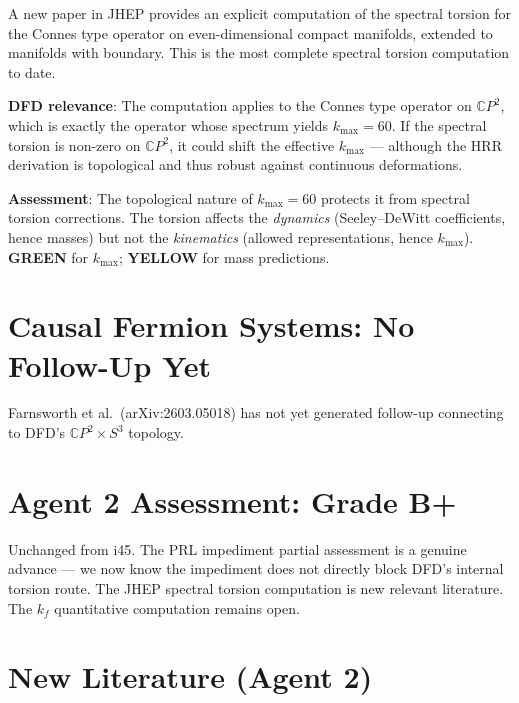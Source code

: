 \documentclass[11pt,a4paper]{article}
\newcommand{\GREEN}{\textcolor{dfdgreen}{\textbf{GREEN}}}
\newcommand{\YELLOW}{\textcolor{dfdyellow}{\textbf{YELLOW}}}
\newcommand{\CP}{\mathbb{C}P}
\begin{document}
\begin{tcolorbox}[colback=blue!5!white, colframe=blue!60!black,
  title={JHEP (February 2025): Spectral Torsion for Connes Type Operator}]

A new paper in JHEP provides an explicit computation of the spectral torsion for the Connes type operator on even-dimensional compact manifolds, extended to manifolds with boundary. This is the most complete spectral torsion computation to date.

\textbf{DFD relevance}: The computation applies to the Connes type operator on $\CP^2$, which is exactly the operator whose spectrum yields $k_{\max} = 60$. If the spectral torsion is non-zero on $\CP^2$, it could shift the effective $k_{\max}$ --- although the HRR derivation is topological and thus robust against continuous deformations.

\textbf{Assessment}: The topological nature of $k_{\max} = 60$ protects it from spectral torsion corrections. The torsion affects the \emph{dynamics} (Seeley--DeWitt coefficients, hence masses) but not the \emph{kinematics} (allowed representations, hence $k_{\max}$). \GREEN{} for $k_{\max}$; \YELLOW{} for mass predictions.
\end{tcolorbox}

\section{Causal Fermion Systems: No Follow-Up Yet}

Farnsworth et al.\ (arXiv:2603.05018) has not yet generated follow-up connecting to DFD's $\CP^2 \times S^3$ topology.

\section{Agent 2 Assessment: Grade B+}

Unchanged from i45. The PRL impediment partial assessment is a genuine advance --- we now know the impediment does not directly block DFD's internal torsion route. The JHEP spectral torsion computation is new relevant literature. The $k_f$ quantitative computation remains open.

\section{New Literature (Agent 2)}
\end{document}
